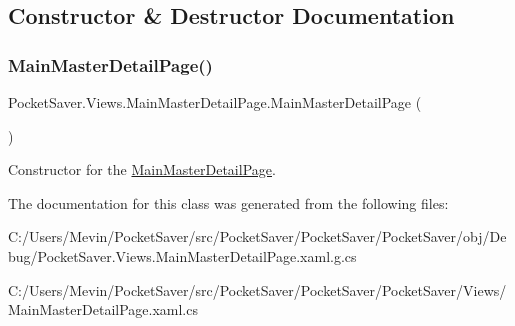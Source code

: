 \subsection{Constructor \& Destructor Documentation}
\mbox{\label{class_pocket_saver_1_1_views_1_1_main_master_detail_page_ac8ec8ea55d0c0c111d1c58255406f16f}} 
\subsubsection{\texorpdfstring{Main\+Master\+Detail\+Page()}{MainMasterDetailPage()}}
{\footnotesize\ttfamily Pocket\+Saver.\+Views.\+Main\+Master\+Detail\+Page.\+Main\+Master\+Detail\+Page (\begin{DoxyParamCaption}{ }\end{DoxyParamCaption})\hspace{0.3cm}{\ttfamily [inline]}}



Constructor for the \hyperlink{class_pocket_saver_1_1_views_1_1_main_master_detail_page}{Main\+Master\+Detail\+Page}. 



The documentation for this class was generated from the following files\+:\begin{DoxyCompactItemize}
\item 
C\+:/\+Users/\+Mevin/\+Pocket\+Saver/src/\+Pocket\+Saver/\+Pocket\+Saver/\+Pocket\+Saver/obj/\+Debug/Pocket\+Saver.\+Views.\+Main\+Master\+Detail\+Page.\+xaml.\+g.\+cs\item 
C\+:/\+Users/\+Mevin/\+Pocket\+Saver/src/\+Pocket\+Saver/\+Pocket\+Saver/\+Pocket\+Saver/\+Views/Main\+Master\+Detail\+Page.\+xaml.\+cs\end{DoxyCompactItemize}
